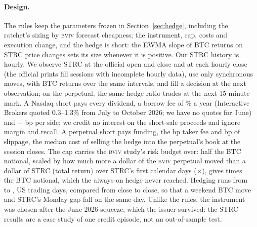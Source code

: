 \documentclass[10pt,a4paper]{article}
\newcommand{\BVIV}{\textsc{bviv}}
\begin{document}
\paragraph{Design.} The rules keep the parameters frozen in Section~\ref{sec:hedge}, including the ratchet's sizing by \BVIV{} forecast cheapness; the instrument, cap, costs and execution change, and the hedge is short: the EWMA slope of BTC returns on STRC price changes sets its size whenever it is positive. Our STRC history is hourly. We observe STRC at the official open and close and at each hourly close (the official prints fill \StrcGaps{} sessions with incomplete hourly data), use only synchronous moves, with BTC returns over the same intervals, and fill a decision at the next observation; on the perpetual, the same hedge ratio trades at the next 15-minute mark. A Nasdaq short pays every dividend, a borrow fee of \StrcBorrow\% a year (Interactive Brokers quoted 0.3--1.3\% from July to October 2026; we have no quotes for June) and \StrcFee+\StrcSlip{} bp per side; we credit no interest on the short-sale proceeds and ignore margin and recall. A perpetual short pays funding, the \StrcPerpFee{} bp taker fee and \StrcPerpSlip{} bp of slippage, the median cost of selling the hedge into the perpetual's book at the session closes. The cap carries the \BVIV{} study's risk budget over: half the BTC notional, scaled by how much more a dollar of the \BVIV{} perpetual moved than a dollar of STRC (total return) over STRC's first \StrcWarmup{} calendar days (\StrcVolRatio$\times$), gives \StrcCap{} times the BTC notional, which the always-on hedge never reached. Hedging runs from \StrcEvalStart{} to \StrcEvalEnd, \StrcEvalDays{} US trading days, compared from close to close, so that a weekend BTC move and STRC's Monday gap fall on the same day. Unlike the rules, the instrument was chosen after the June 2026 squeeze, which the issuer survived: the STRC results are a case study of one credit episode, not an out-of-sample test.

\begin{table}[t]
\centering\small\setlength{\tabcolsep}{4.5pt}

\caption{Hedging a 1-BTC spot book by shorting STRC, \StrcEvalStart{} to \StrcEvalEnd{} (\StrcEvalDays{} US trading days; \%, Notional in \% of BTC). Columns as in Table~\ref{tab:livehedge}; Hedge P\&L is price P\&L minus carry; Carry: dividends and borrow fee (Nasdaq) or funding (perpetual), \% of BTC notional a year. Unhedged maximum drawdown: \StrcMddUnhedged\%. Middle panel: the \BVIV{} hedge of Section~\ref{sec:live} on the same trading days, alone and at half size next to half the STRC hedge. Bottom panel: the same hedge ratio on Nasdaq and on the perpetual from the latter's listing; 71 days cannot estimate ES or drawdowns.}
\label{tab:strc}
\end{table}
\end{document}
